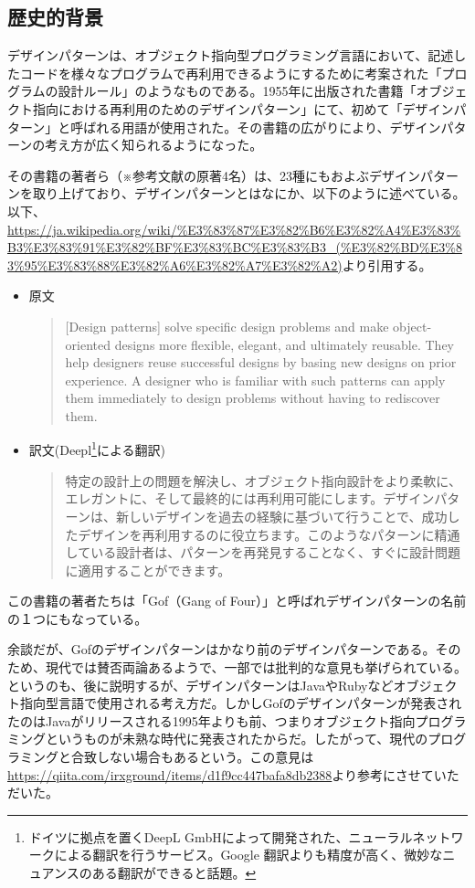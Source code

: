 \documentclass[dvipdfmx]{jsarticle}
\begin{document}
\subsection{歴史的背景}
デザインパターンは、オブジェクト指向型プログラミング言語において、記述したコードを様々なプログラムで再利用できるようにするために考案された「プログラムの設計ルール」のようなものである。1955年に出版された書籍「オブジェクト指向における再利用のためのデザインパターン\cite{book01}」にて、初めて「デザインパターン」と呼ばれる用語が使用された。その書籍の広がりにより、デザインパターンの考え方が広く知られるようになった。\par
その書籍の著者ら（※参考文献の原著4名）は、23種にもおよぶデザインパターンを取り上げており、デザインパターンとはなにか、以下のように述べている。以下、\url{https://ja.wikipedia.org/wiki/%E3%83%87%E3%82%B6%E3%82%A4%E3%83%B3%E3%83%91%E3%82%BF%E3%83%BC%E3%83%B3_(%E3%82%BD%E3%83%95%E3%83%88%E3%82%A6%E3%82%A7%E3%82%A2)}より引用する。
\begin{itemize}
  \item 原文
  \begin{quote}
    [Design patterns] solve specific design problems and make object-oriented designs more flexible, elegant, and ultimately reusable. They help designers reuse successful designs by basing new designs on prior experience. A designer who is familiar with such patterns can apply them immediately to design problems without having to rediscover them.
  \end{quote}
  \item 訳文(Deepl\footnote{ドイツに拠点を置くDeepL GmbHによって開発された、ニューラルネットワークによる翻訳を行うサービス。Google 翻訳よりも精度が高く、微妙なニュアンスのある翻訳ができると話題。}による翻訳)
  \begin{quote}
    特定の設計上の問題を解決し、オブジェクト指向設計をより柔軟に、エレガントに、そして最終的には再利用可能にします。デザインパターンは、新しいデザインを過去の経験に基づいて行うことで、成功したデザインを再利用するのに役立ちます。このようなパターンに精通している設計者は、パターンを再発見することなく、すぐに設計問題に適用することができます。
  \end{quote}
\end{itemize}
この書籍の著者たちは「Gof（Gang of Four）」と呼ばれデザインパターンの名前の１つにもなっている。\par
余談だが、Gofのデザインパターンはかなり前のデザインパターンである。そのため、現代では賛否両論あるようで、一部では批判的な意見も挙げられている。というのも、後に説明するが、デザインパターンはJavaやRubyなどオブジェクト指向型言語で使用される考え方だ。しかしGofのデザインパターンが発表されたのはJavaがリリースされる1995年よりも前、つまりオブジェクト指向プログラミングというものが未熟な時代に発表されたからだ。したがって、現代のプログラミングと合致しない場合もあるという。この意見は\url{https://qiita.com/irxground/items/d1f9cc447bafa8db2388}より参考にさせていただいた。
\end{document}
